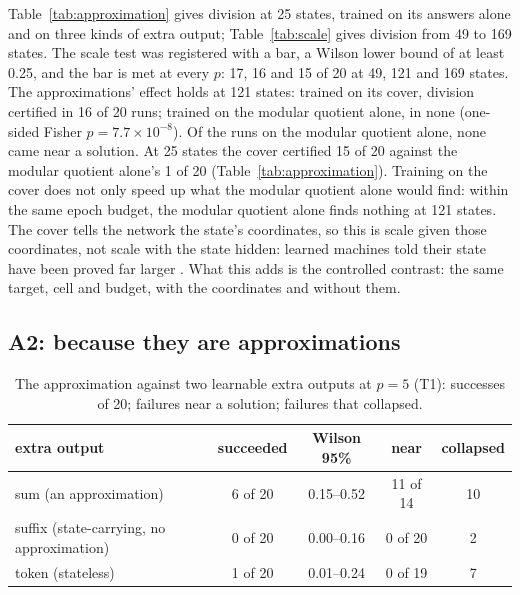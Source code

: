 \documentclass[11pt]{article}
\newcommand{\pn}[2]{#2}
\begin{document}
Table~\ref{tab:approximation} gives division at 25 states, trained on its answers alone and on
three kinds of extra output; Table~\ref{tab:scale} gives division from 49 to 169 states. The scale test was registered with a bar, a Wilson lower bound of at least 0.25, and the bar is met
at every $p$: \pn{k6.rates}{17, 16 and 15} of \pn{k6.seeds}{20} at 49, 121 and 169 states. The
approximations' effect holds at 121 states: trained on its cover, division certified in
\pn{k4.cover}{16} of 20 runs; trained on the modular quotient alone, in \pn{k4.quotient}{none} (one-sided
Fisher $p = \pn{k4.p}{7.7 \times 10^{-8}}$). Of the runs on the modular quotient alone, \pn{k4.quotient-near}{none}
came near a solution. At 25 states the cover certified \pn{k4.claim-cover}{15} of 20 against the
modular quotient alone's \pn{k4.claim-quotient}{1} of 20 (Table~\ref{tab:approximation}). Training on the cover does not
only speed up what the modular quotient alone would find: within the same epoch budget, the modular quotient alone
finds nothing at 121 states. The cover tells the network the state's coordinates, so this is scale
given those coordinates, not scale with the state hidden: learned machines told their state have
been proved far larger \citep{brandoit-2026-length-independent-state-tracking}. What
this adds is the controlled contrast: the same target, cell and budget, with the coordinates and
without them.

\subsection{A2: because they are approximations}
\label{sec:a2}

\begin{table}[t]
\centering
\caption{The approximation against two learnable extra outputs at $p = 5$ (T1): successes of 20; failures near a solution; failures that collapsed.}
\label{tab:extra-outputs}
\begin{tabular}{lcccc}
\toprule
extra output & succeeded & Wilson 95\% & near & collapsed \\
\midrule
sum (an approximation) & 6 of 20 & 0.15--0.52 & 11 of 14 & 10 \\
suffix (state-carrying, no approximation) & 0 of 20 & 0.00--0.16 & 0 of 20 & 2 \\
token (stateless) & 1 of 20 & 0.01--0.24 & 0 of 19 & 7 \\
\bottomrule
\end{tabular}
\end{table}
\end{document}

